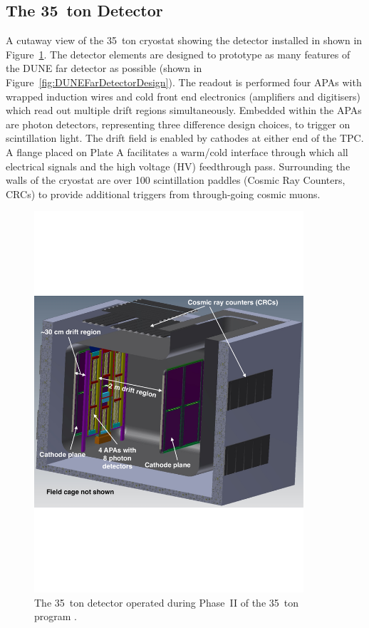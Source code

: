 \subsection{The 35~ton Detector}\label{sec:35tonDetector}

A cutaway view of the 35~ton cryostat showing the detector installed in shown in Figure~\ref{fig:35tonDetector}.  The detector elements are designed to prototype as many features of the DUNE far detector as possible (shown in Figure~\ref{fig:DUNEFarDetectorDesign}).  The readout is performed four APAs with wrapped induction wires and cold front end electronics (amplifiers and digitisers) which read out multiple drift regions simultaneously.  Embedded within the APAs are photon detectors, representing three difference design choices, to trigger on scintillation light.  The drift field is enabled by cathodes at either end of the TPC.  A flange placed on Plate A facilitates a warm/cold interface through which all electrical signals and the high voltage (HV) feedthrough pass.  Surrounding the walls of the cryostat are over 100 scintillation paddles (Cosmic Ray Counters, CRCs) to provide additional triggers from through-going cosmic muons.

\begin{figure}
  \centering
  \includegraphics[width=10cm]{35tonDetector.pdf}
  \caption[The 35~ton detector operated during Phase~II of the 35~ton program.]{The 35~ton detector operated during Phase~II of the 35~ton program \cite{35tonPhaseINeutrino2014}.}
  \label{fig:35tonDetector}
\end{figure}

